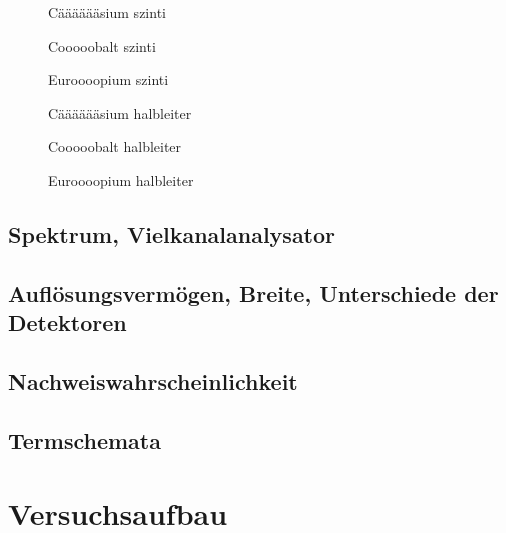 \documentclass[11pt, a4paper]{article}
\numberwithin{equation}{section}
\begin{document}
\begin{figure}[h]
	\centering
	
	\caption{Cääääääsium szinti}
	\label{fig:caesium_spektrum}
\end{figure}

\begin{figure}[h]
	\centering
	
	\caption{Cooooobalt szinti}
	\label{fig:cobalt_spektrum}
\end{figure}

\begin{figure}[h]
	\centering
	
	\caption{Euroooopium szinti}
	\label{fig:europium_spektrum}
\end{figure}

\begin{figure}[h]
	\centering
	
	\caption{Cääääääsium halbleiter}
	\label{fig:caesium_spektrum}
\end{figure}

\begin{figure}[h]
	\centering
	
	\caption{Cooooobalt halbleiter}
	\label{fig:cobalt_spektrum}
\end{figure}

\begin{figure}[h]
	\centering
	
	\caption{Euroooopium halbleiter}
	\label{fig:europium_spektrum}
\end{figure}

\subsection{Spektrum, Vielkanalanalysator}

\subsection{Auflösungsvermögen, Breite, Unterschiede der Detektoren}

\subsection{Nachweiswahrscheinlichkeit}

\subsection{Termschemata}


\section{Versuchsaufbau}
\end{document}
